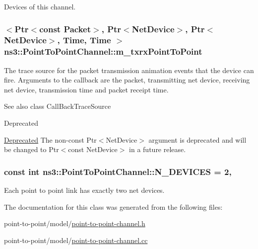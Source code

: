 Devices of this channel. 

\subsubsection[{\texorpdfstring{m\+\_\+txrx\+Point\+To\+Point}{m_txrxPointToPoint}}]{$<${\bf Ptr}$<$const {\bf Packet}$>$, {\bf Ptr}$<${\bf Net\+Device}$>$, {\bf Ptr}$<${\bf Net\+Device}$>$, {\bf Time}, {\bf Time} $>$ ns3\+::\+Point\+To\+Point\+Channel\+::m\+\_\+txrx\+Point\+To\+Point\hspace{0.3cm}{\ttfamily [private]}}\hypertarget{classns3_1_1PointToPointChannel_ab6758265946f321dc3d2d36040902eb6}{}\label{classns3_1_1PointToPointChannel_ab6758265946f321dc3d2d36040902eb6}
The trace source for the packet transmission animation events that the device can fire. Arguments to the callback are the packet, transmitting net device, receiving net device, transmission time and packet receipt time.

\begin{DoxySeeAlso}{See also}
class Call\+Back\+Trace\+Source 
\end{DoxySeeAlso}
\begin{DoxyRefDesc}{Deprecated}
\item[\hyperlink{deprecated__deprecated000025}{Deprecated}]The non-\/const {\ttfamily Ptr$<$\+Net\+Device$>$} argument is deprecated and will be changed to {\ttfamily Ptr$<$const Net\+Device$>$} in a future release. \end{DoxyRefDesc}
\subsubsection[{\texorpdfstring{N\+\_\+\+D\+E\+V\+I\+C\+ES}{N_DEVICES}}]{\setlength{\rightskip}{0pt plus 5cm}const int ns3\+::\+Point\+To\+Point\+Channel\+::\+N\+\_\+\+D\+E\+V\+I\+C\+ES = 2\hspace{0.3cm}{\ttfamily [static]}, {\ttfamily [private]}}\hypertarget{classns3_1_1PointToPointChannel_aa40520f14e7c17c01a563f5d89f67d5b}{}\label{classns3_1_1PointToPointChannel_aa40520f14e7c17c01a563f5d89f67d5b}
Each point to point link has exactly two net devices. 

The documentation for this class was generated from the following files\+:\begin{DoxyCompactItemize}
\item 
point-\/to-\/point/model/\hyperlink{point-to-point-channel_8h}{point-\/to-\/point-\/channel.\+h}\item 
point-\/to-\/point/model/\hyperlink{point-to-point-channel_8cc}{point-\/to-\/point-\/channel.\+cc}\end{DoxyCompactItemize}
